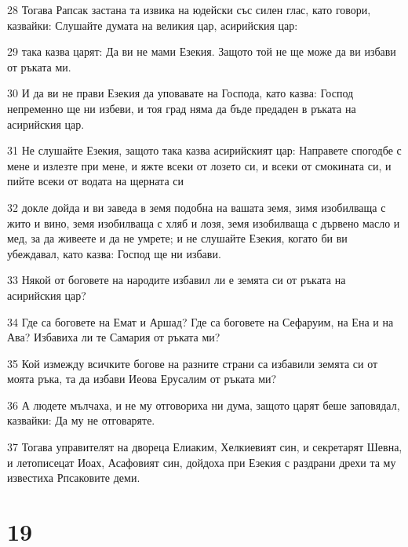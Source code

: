 \par 28 Тогава Рапсак застана та извика на юдейски със силен глас, като говори, казвайки: Слушайте думата на великия цар, асирийския цар:
\par 29 така казва царят: Да ви не мами Езекия. Защото той не ще може да ви избави от ръката ми.
\par 30 И да ви не прави Езекия да уповавате на Господа, като казва: Господ непременно ще ни избеви, и тоя град няма да бъде предаден в ръката на асирийския цар.
\par 31 Не слушайте Езекия, защото така казва асирийският цар: Направете спогодбе с мене и излезте при мене, и яжте всеки от лозето си, и всеки от смокината си, и пийте всеки от водата на щерната си
\par 32 докле дойда и ви заведа в земя подобна на вашата земя, зимя изобилваща с жито и вино, земя изобилваща с хляб и лозя, земя изобилваща с дървено масло и мед, за да живеете и да не умрете; и не слушайте Езекия, когато би ви убеждавал, като казва: Господ ще ни избави.
\par 33 Някой от боговете на народите избавил ли е земята си от ръката на асирийския цар?
\par 34 Где са боговете на Емат и Аршад? Где са боговете на Сефаруим, на Ена и на Ава? Избавиха ли те Самария от ръката ми?
\par 35 Кой измежду всичките богове на разните страни са избавили земята си от моята ръка, та да избави Иеова Ерусалим от ръката ми?
\par 36 А людете мълчаха, и не му отговориха ни дума, защото царят беше заповядал, казвайки: Да му не отговаряте.
\par 37 Тогава управителят на двореца Елиаким, Хелкиевият син, и секретарят Шевна, и летописецат Иоах, Асафовият син, дойдоха при Езекия с раздрани дрехи та му известиха Рпсаковите деми.

\chapter{19}

